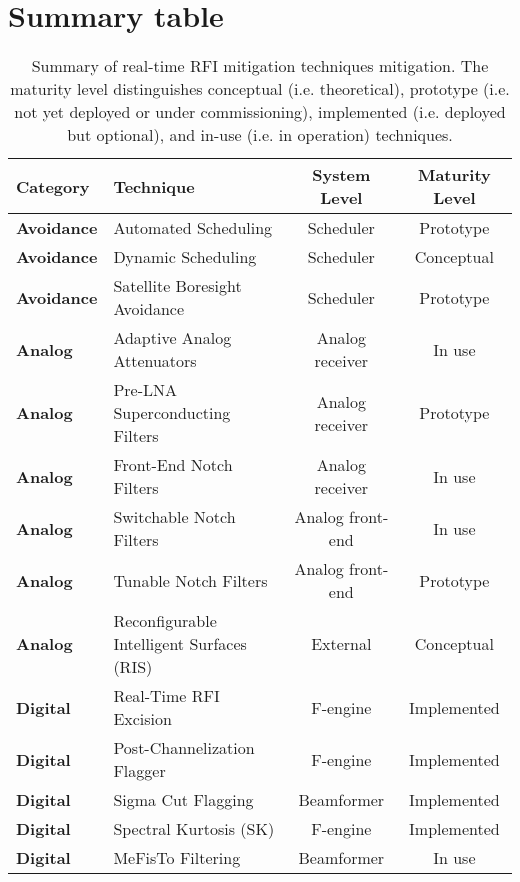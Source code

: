 \section{Summary table} %
\label{section:hardware:summary}


\begin{table}
  \begin{center}
  \caption{Summary of real-time RFI mitigation techniques mitigation. The maturity level distinguishes conceptual (i.e. theoretical), prototype (i.e. not yet deployed or under commissioning), implemented (i.e. deployed but optional), and in-use (i.e. in operation) techniques.}
 \label{real-time-tech}
 {\scriptsize
\begin{tabular}{|l|l|c|c|} \hline 
{\bf Category} & {\bf Technique} & {\bf System Level} & {\bf Maturity Level} \\ 
\hline
\textbf{Avoidance} & Automated Scheduling & Scheduler & Prototype \\ \hline
\textbf{Avoidance} & Dynamic Scheduling & Scheduler & Conceptual \\ \hline
\textbf{Avoidance} & Satellite Boresight Avoidance & Scheduler & Prototype \\ \hline
\textbf{Analog} & Adaptive Analog Attenuators & Analog receiver & In use \\ \hline
\textbf{Analog} & Pre-LNA Superconducting Filters & Analog receiver & Prototype \\ \hline
\textbf{Analog} & Front-End Notch Filters & Analog receiver & In use \\ \hline
\textbf{Analog} & Switchable Notch Filters & Analog front-end & In use \\ \hline
\textbf{Analog} & Tunable Notch Filters & Analog front-end & Prototype \\ \hline
\textbf{Analog} & Reconfigurable Intelligent Surfaces (RIS) & External & Conceptual \\ \hline
\textbf{Digital} & Real-Time RFI Excision & F-engine & Implemented \\ \hline
\textbf{Digital} & Post-Channelization Flagger & F-engine & Implemented \\ \hline
\textbf{Digital} & Sigma Cut Flagging & Beamformer & Implemented \\ \hline
\textbf{Digital} & Spectral Kurtosis (SK) & F-engine & Implemented \\ \hline
\textbf{Digital} & MeFisTo Filtering & Beamformer & In use \\ \hline

\end{tabular}}
\end{center}
\end{table}
